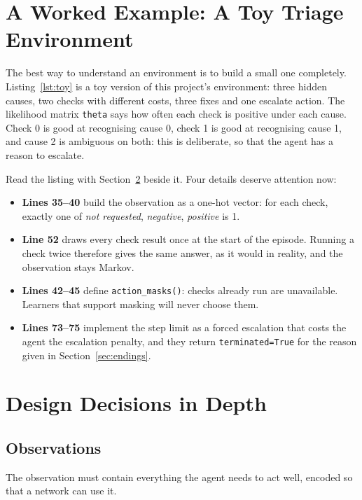 \documentclass[11pt,a4paper]{article}
\begin{document}
\section{A Worked Example: A Toy Triage Environment}
\label{sec:toy}

The best way to understand an environment is to build a small one completely. Listing~\ref{lst:toy} is a toy version of this project's environment: three hidden causes, two checks with different costs, three fixes and one escalate action. The likelihood matrix \texttt{theta} says how often each check is positive under each cause. Check 0 is good at recognising cause 0, check 1 is good at recognising cause 1, and cause 2 is ambiguous on both: this is deliberate, so that the agent has a reason to escalate.



Read the listing with Section~\ref{sec:design} beside it. Four details deserve attention now:
\begin{itemize}
  \item \textbf{Lines 35--40} build the observation as a one-hot vector: for each check, exactly one of \emph{not requested}, \emph{negative}, \emph{positive} is 1.
  \item \textbf{Line 52} draws every check result once at the start of the episode. Running a check twice therefore gives the same answer, as it would in reality, and the observation stays Markov.
  \item \textbf{Lines 42--45} define \texttt{action\_masks()}: checks already run are unavailable. Learners that support masking will never choose them.
  \item \textbf{Lines 73--75} implement the step limit as a forced escalation that costs the agent the escalation penalty, and they return \texttt{terminated=True} for the reason given in Section~\ref{sec:endings}.
\end{itemize}

\section{Design Decisions in Depth}
\label{sec:design}

\subsection{Observations}
\label{sec:obs}
The observation must contain everything the agent needs to act well, encoded so that a network can use it.
\end{document}
